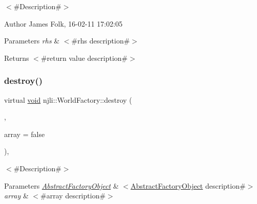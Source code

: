 $<$\#\+Description\#$>$ 

\begin{DoxyAuthor}{Author}
James Folk, 16-\/02-\/11 17\+:02\+:05
\end{DoxyAuthor}

\begin{DoxyParams}{Parameters}
{\em rhs} & $<$\#rhs description\#$>$\\
\hline
\end{DoxyParams}
\begin{DoxyReturn}{Returns}
$<$\#return value description\#$>$ 
\end{DoxyReturn}
\mbox{\label{classnjli_1_1_world_factory_a89cd6287f3762e13a950c01032639c04}} 
\subsubsection{\texorpdfstring{destroy()}{destroy()}}
{\footnotesize\ttfamily virtual \mbox{\hyperlink{_thread_8h_af1e856da2e658414cb2456cb6f7ebc66}{void}} njli\+::\+World\+Factory\+::destroy (\begin{DoxyParamCaption}\item[{\mbox{\hyperlink{classnjli_1_1_abstract_factory_object}{Abstract\+Factory\+Object}} $\ast$}]{,  }\item[{bool}]{array = {\ttfamily false} }\end{DoxyParamCaption})\hspace{0.3cm}{\ttfamily [protected]}, {\ttfamily [virtual]}}

$<$\#\+Description\#$>$


\begin{DoxyParams}{Parameters}
{\em \mbox{\hyperlink{classnjli_1_1_abstract_factory_object}{Abstract\+Factory\+Object}}} & $<$\mbox{\hyperlink{classnjli_1_1_world_factory_a59f5fcb165066624f68fb5417aa3586e}{Abstract\+Factory\+Object}} description\#$>$ \\
\hline
{\em array} & $<$\#array description\#$>$ \\
\hline
\end{DoxyParams}
\mbox{\label{classnjli_1_1_world_factory_a2ab6116ee5ff90d27f7661c6e211620a}} 
